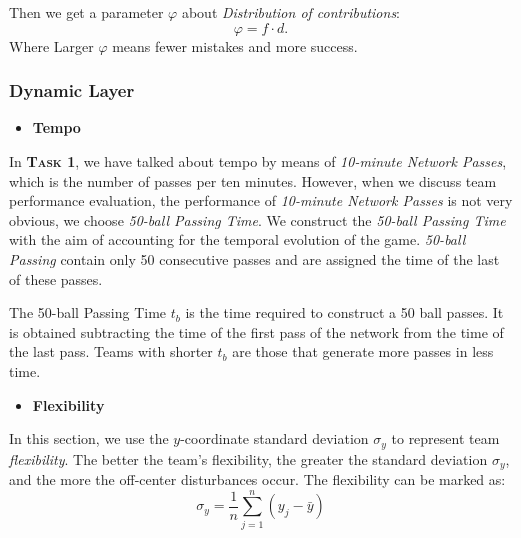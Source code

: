 \documentclass[12pt]{article}  %
\newcommand{\upcite}[1]{\textsuperscript{\textsuperscript{\cite{#1}}}}
\begin{document}
Then we get a parameter $\varphi$ about \textit{Distribution of contributions}:
\begin{equation}
    \varphi=f\cdot d.
\end{equation}
Where Larger $\varphi$ means fewer mistakes and more success.

\subsubsection{Dynamic Layer}
\begin{itemize}
    \item \textbf{Tempo}
\end{itemize}

In \textbf{\textsc{Task 1}}, we have talked about tempo by means of \textit{10-minute Network Passes}, which is the number of passes per ten minutes. However, when we discuss team performance evaluation, the performance of \textit{10-minute Network Passes} is not very obvious, we choose \textit{50-ball Passing Time}\upcite{6}. We construct the \textit{50-ball Passing Time} with the aim of accounting for the temporal evolution of the game. \textit{50-ball Passing} contain only 50 consecutive passes and are assigned the time of the last of these passes.

The 50-ball Passing Time $t_{b}$ is the time required to construct a 50 ball passes. It is obtained subtracting the time of the first pass of the network from the time of the last pass. Teams with shorter $t_b$ are those that generate more passes in less time.

\vspace{4pt}
\begin{itemize}
    \item \textbf{Flexibility}
\end{itemize}

In this section, we use the $y$-coordinate standard deviation $\sigma_y$ to represent team \textit{flexibility}. The better the team's flexibility, the greater the standard deviation $\sigma_y$, and the more the off-center disturbances occur. The flexibility can be marked as:
\begin{equation}
    \sigma_y=\frac{1}{n}\sum_{j=1}^{n}(y_j-\bar{y})
\end{equation}
\end{document}
